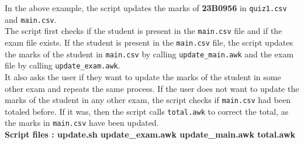 \documentclass{article}
\begin{document}
In the above example, the script updates the marks of \textbf{23B0956} in \verb"quiz1.csv" and \verb"main.csv".\\
The script first checks if the student is present in the \verb"main.csv" file and if the exam file exists. If the student is present in the \verb"main.csv" file, the script updates the marks of the student in \verb"main.csv" by calling \verb"update_main.awk" and the exam file by calling \verb"update_exam.awk".\\
It also asks the user if they want to update the marks of the student in some other exam and repeats the same process. If the user does not want to update the marks of the student in any other exam, the script checks if \verb"main.csv" had been totaled before. If it was, then the script calls \verb"total.awk" to correct the total, as the marks in \verb"main.csv" have been updated.\\
\textbf{Script files : update.sh update\_exam.awk update\_main.awk total.awk} 
\end{document}
